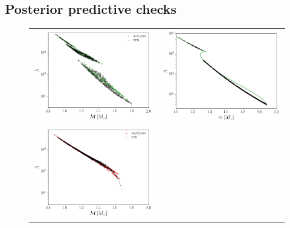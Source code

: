\documentclass[aps,prd,twocolumn,superscriptaddress,nofootinbib]{revtex4-1}
\begin{document}
\subsection{Posterior predictive checks}

\begin{figure}
    \begin{tabular}{cc}
      \includegraphics[width=0.95\columnwidth]{SKI52009_ppd.png} &
      \includegraphics[width=0.95\columnwidth]{SKI52009_ppd2.png} \\
      \includegraphics[width=0.95\columnwidth]{SK2723505_ppd.png} &

\end{tabular}
\end{figure}
\end{document}
